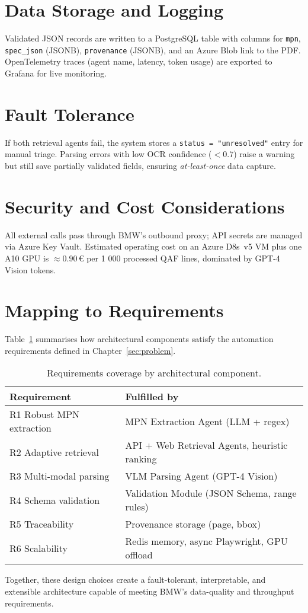 \section{Data Storage and Logging}
Validated JSON records are written to a PostgreSQL table with columns for \verb|mpn|, \verb|spec_json| (JSONB), \verb|provenance| (JSONB), and an Azure Blob link to the PDF.  
OpenTelemetry traces (agent name, latency, token usage) are exported to Grafana for live monitoring.

\section{Fault Tolerance}
If both retrieval agents fail, the system stores a \verb|status = "unresolved"| entry for manual triage.  
Parsing errors with low OCR confidence ($<0.7$) raise a warning but still save partially validated fields, ensuring \emph{at-least-once} data capture.

\section{Security and Cost Considerations}
All external calls pass through BMW’s outbound proxy; API secrets are managed via Azure Key Vault.  
Estimated operating cost on an Azure D8s~v5 VM plus one A10 GPU is \(\approx 0.90\,€\) per 1 000 processed QAF lines, dominated by GPT-4 Vision tokens.

\section{Mapping to Requirements}
Table~\ref{tab:reqmap} summarises how architectural components satisfy the automation requirements defined in Chapter~\ref{sec:problem}.

\begin{table}[ht]
  \centering
  \caption{Requirements coverage by architectural component.}
  \label{tab:reqmap}
  \begin{tabular}{ll}
    \hline
    Requirement & Fulfilled by \\\hline
    R1 Robust MPN extraction & MPN Extraction Agent (LLM + regex) \\
    R2 Adaptive retrieval    & API + Web Retrieval Agents, heuristic ranking \\
    R3 Multi-modal parsing   & VLM Parsing Agent (GPT-4 Vision) \\
    R4 Schema validation     & Validation Module (JSON Schema, range rules) \\
    R5 Traceability          & Provenance storage (page, bbox) \\
    R6 Scalability           & Redis memory, async Playwright, GPU offload \\\hline
  \end{tabular}
\end{table}

Together, these design choices create a fault-tolerant, interpretable, and extensible architecture capable of meeting BMW’s data-quality and throughput requirements.
